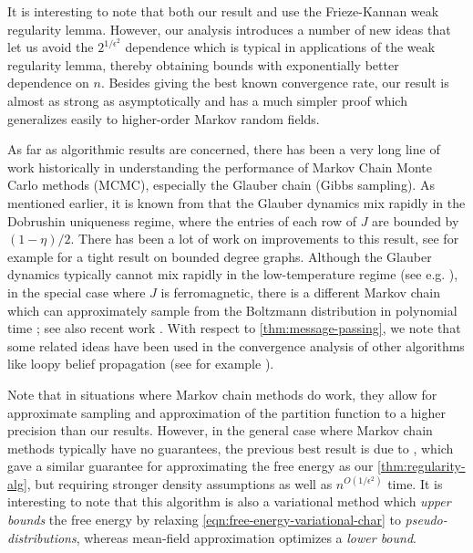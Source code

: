 \documentclass[final, 12pt]{colt2018}
\theoremstyle{definition}
\theoremstyle{plain}
\begin{document}
It is interesting to note that both our result 
and \citep{borgs2012convergent} use the Frieze-Kannan weak regularity lemma. However, our analysis introduces a number of new ideas that let us avoid the $2^{1/\epsilon^2}$ dependence which is typical in applications of the weak regularity lemma, thereby obtaining bounds with exponentially better dependence on $n$. Besides giving the best known convergence rate, our result is almost as strong as \citep{basak2017universality,eldan2016gaussian} asymptotically and has a much
simpler proof which generalizes easily to higher-order Markov random fields. %

As far as algorithmic results are concerned, there has been a very long line of work historically in understanding the performance
of Markov Chain Monte Carlo methods (MCMC), especially the Glauber chain (Gibbs sampling). As mentioned earlier, it is known from \citep{dobrushin-uniqueness} that the Glauber dynamics
mix rapidly in the Dobrushin uniqueness regime, where the entries of each row of $J$ are bounded by $(1 - \eta)/2$. There has been
a lot of work on improvements to this result, see for example
\citep{mossel-sly} for a tight result on bounded degree graphs.
Although the Glauber dynamics typically cannot mix rapidly in the low-temperature regime (see e.g. \cite{sly-sun}), in the special case where $J$ is ferromagnetic, there is a different Markov chain which can approximately sample from the Boltzmann distribution in polynomial time \citep{JerrumSinclair:90}; see also recent work \citep{lss-deterministic}. With respect to \cref{thm:message-passing}, we note that some related ideas have been used in the convergence analysis of other algorithms like loopy belief propagation (see for example \citet{TatikondaJordan:02,mooij-kappen}).

Note that in situations where Markov chain methods do work, they allow for approximate sampling and approximation of the partition
function to a higher precision than our results. However, in the general case where Markov chain methods typically have no guarantees, the previous best result is due to \citep{risteski-ising}, which gave a similar
guarantee for approximating the free energy as our \cref{thm:regularity-alg}, but requiring stronger
density assumptions as well as $n^{O(1/\epsilon^2)}$ time. It is interesting to note that this algorithm is also a variational method which \emph{upper bounds} the free energy by relaxing \cref{eqn:free-energy-variational-char} to \emph{pseudo-distributions}, 
whereas mean-field approximation optimizes a \emph{lower bound}.
\end{document}

